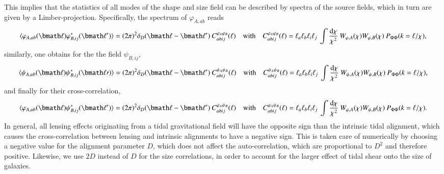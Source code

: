 \documentclass[a4paper,fleqn,usenatbib]{mnras}
\newcommand{\bra}{\langle}
\newcommand{\ket}{\rangle}
\newcommand{\dd}{\mathrm{d}}
\newcommand{\dirac}{\delta_D}
\begin{document}
This implies that the statistics of all modes of the shape and size field can be described by spectra of the source fields, which in turn are given by a Limber-projection. Specifically, the spectrum of $\varphi_{A,ab}$ reads
\begin{equation}
\bra\varphi_{A,ab}(\bmath\ell)\varphi_{B,ij}^*(\bmath\ell^\prime)\ket = 
(2\pi)^2\dirac(\bmath\ell-\bmath\ell^\prime)\:C^{\varphi_A\varphi_B}_{abij}(\ell)
\quad\mathrm{with}\quad
C^{\varphi_A\varphi_B}_{abij}(\ell) = 
\ell_a\ell_b\ell_i\ell_j\:\int\frac{\dd\chi}{\chi^2}\:W_{\varphi,A}(\chi)W_{\varphi,B}(\chi)\:P_{\Phi\Phi}(k = \ell/\chi),
\end{equation}
similarly, one obtains for the the field $\psi_{B,ij}$,
\begin{equation}
\bra\psi_{A,ab}(\bmath\ell)\psi_{B,ij}^*(\bmath\ell\prime)\ket = 
(2\pi)^2\dirac(\bmath\ell-\bmath\ell^\prime)\:C^{\psi_A\psi_B}_{abij}(\ell)
\quad\mathrm{with}\quad
C^{\psi_A\psi_B}_{abij}(\ell) = 
\ell_a\ell_b\ell_i\ell_j\:\int\frac{\dd\chi}{\chi^2}\:W_{\psi,A}(\chi)W_{\psi,B}(\chi)\:P_{\Phi\Phi}(k = \ell/\chi),
\end{equation}
and finally for their cross-correlation,
\begin{equation}
\bra\varphi_{A,ab}(\bmath\ell)\psi_{B,ij}^*(\bmath\ell^\prime)\ket =
(2\pi)^2\dirac(\bmath\ell-\bmath\ell^\prime)\:C^{\varphi_A\psi_B}_{abij}(\ell)
\quad\mathrm{with}\quad
C^{\varphi_A\psi_B}_{abij}(\ell) =
\ell_a\ell_b\ell_i\ell_j\:\int\frac{\dd\chi}{\chi^2}\:W_{\varphi,A}(\chi)W_{\psi,B}(\chi)\:P_{\Phi\Phi}(k = \ell/\chi).
\end{equation}
In general, all lensing effects originating from a tidal gravitational field will have the opposite sign than the intrinsic tidal alignment, which causes the cross-correlation between lensing and intrinsic alignments to have a negative sign. This is taken care of numerically by choosing a negative value for the alignment parameter $D$, which does not affect the auto-correlation, which are proportional to $D^2$ and therefore positive. Likewise, we use $2D$ instead of $D$ for the size correlations, in order to account for the larger effect of tidal shear onto the size of galaxies.


\end{document}
